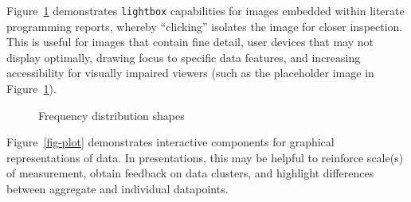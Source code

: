 \documentclass[
  letterpaper,
  DIV=11,
  numbers=noendperiod,
  oneside]{scrreprt}
\begin{document}
Figure~\ref{fig-kitty} demonstrates \texttt{lightbox} capabilities for
images embedded within literate programming reports, whereby
``clicking'' isolates the image for closer inspection. This is useful
for images that contain fine detail, user devices that may not display
optimally, drawing focus to specific data features, and increasing
accessibility for visually impaired viewers (such as the placeholder
image in Figure~\ref{fig-kitty}).

\begin{figure}


\caption{\label{fig-kitty}Frequency distribution shapes}

\end{figure}%

Figure~\ref{fig-plot} demonstrates interactive components for graphical
representations of data. In presentations, this may be helpful to
reinforce scale(s) of measurement, obtain feedback on data clusters, and
highlight differences between aggregate and individual datapoints.
\end{document}

